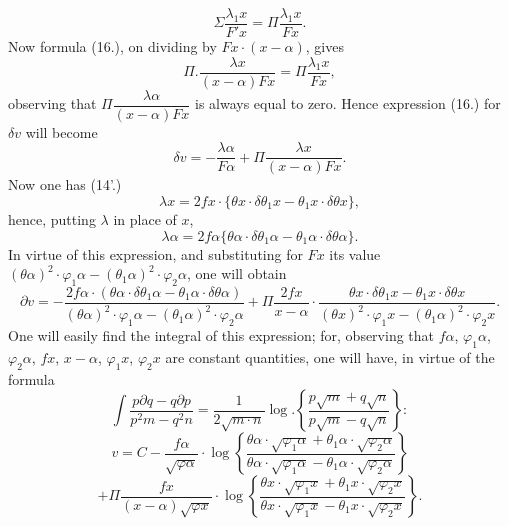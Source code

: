 \documentclass{article}
\begin{document}
\[ \Sigma\frac{\lambda_1 x}{F'x} = \Pi\frac{\lambda_1 x}{Fx}. \tag{20} \]
Now formula (16.), on dividing by $Fx \cdot (x-\alpha)$, gives
\[ \Pi.\frac{\lambda x}{(x-\alpha)Fx} = \Pi\frac{\lambda_1 x}{Fx}, \tag{21} \]
observing that $\Pi\dfrac{\lambda\alpha}{(x-\alpha)Fx}$ is always equal to zero. Hence expression (16.) for $\delta v$ will become
\[ \delta v = -\frac{\lambda\alpha}{F\alpha} + \Pi\frac{\lambda x}{(x-\alpha)Fx}. \tag{22} \]
Now one has (14'.)
\[ \lambda x = 2fx \cdot \{\theta x \cdot \delta\theta_1 x - \theta_1 x \cdot \delta\theta x\}, \]
hence, putting $\lambda$ in place of $x$,
\[ \lambda\alpha = 2f\alpha\{\theta\alpha \cdot \delta\theta_1\alpha - \theta_1\alpha \cdot \delta\theta\alpha\}. \]
In virtue of this expression, and substituting for $Fx$ its value $(\theta\alpha)^{2} \cdot \varphi_1\alpha - (\theta_1\alpha)^{2} \cdot \varphi_2\alpha$, one will obtain
\[ \partial v = -\frac{2f\alpha \cdot (\theta\alpha \cdot \delta\theta_1\alpha - \theta_1\alpha \cdot \delta\theta\alpha)}{(\theta\alpha)^{2} \cdot \varphi_1\alpha - (\theta_1\alpha)^{2} \cdot \varphi_2\alpha} + \Pi\frac{2fx}{x-\alpha} \cdot \frac{\theta x \cdot \delta\theta_1 x - \theta_1 x \cdot \delta\theta x}{(\theta x)^{2} \cdot \varphi_1 x - (\theta_1\alpha)^{2} \cdot \varphi_2 x}. \]
One will easily find the integral of this expression; for, observing that $f\alpha$, $\varphi_1\alpha$, $\varphi_2\alpha$, $fx$, $x-\alpha$, $\varphi_1 x$, $\varphi_2 x$ are constant quantities, one will have, in virtue of the formula
\[ \int \frac{p\partial q - q\partial p}{p^{2}m - q^{2}n} = \frac{1}{2\sqrt{m \cdot n}}\log.\left\{\frac{p\sqrt{m}+q\sqrt{n}}{p\sqrt{m}-q\sqrt{n}}\right\}: \]
\[ v = C - \frac{f\alpha}{\sqrt{\varphi\alpha}} \cdot \log\left\{\frac{\theta\alpha \cdot \sqrt{\varphi_1\alpha}+\theta_1\alpha \cdot \sqrt{\varphi_2\alpha}}{\theta\alpha \cdot \sqrt{\varphi_1\alpha}-\theta_1\alpha \cdot \sqrt{\varphi_2\alpha}}\right\} \tag{23} \]
\[ + \Pi\frac{fx}{(x-\alpha)\sqrt{\varphi x}} \cdot \log\left\{\frac{\theta x \cdot \sqrt{\varphi_1 x}+\theta_1 x \cdot \sqrt{\varphi_2 x}}{\theta x \cdot \sqrt{\varphi_1 x}-\theta_1 x \cdot \sqrt{\varphi_2 x}}\right\}. \]
\end{document}
